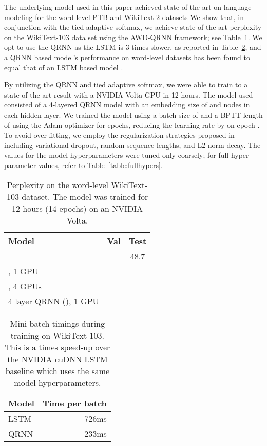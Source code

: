 \documentclass{article}
\begin{document}
The underlying model used in this paper achieved state-of-the-art on language modeling for the word-level PTB and WikiText-2 datasets \cite{merity2018regularizing}
We show that, in conjunction with the tied adaptive softmax, we achieve state-of-the-art perplexity on the WikiText-103 data set using the AWD-QRNN framework; see Table~\ref{table:wikitext103}.
We opt to use the QRNN as the LSTM is 3 times slower, as reported in Table~\ref{table:wt103time}, and a QRNN based model's performance on word-level datasets has been found to equal that of an LSTM based model \citet{merity2018regularizing}.

By utilizing the QRNN and tied adaptive softmax, we were able to train to a state-of-the-art result with a NVIDIA Volta GPU in 12 hours.
The model used consisted of a 4-layered QRNN model with an embedding size of  and  nodes in each hidden layer.
We trained the model using a batch size of  and a BPTT length of  using the Adam optimizer \cite{kingma2014adam} for  epochs, reducing the learning rate by  on epoch .
To avoid over-fitting, we employ the regularization strategies proposed in \cite{merity2018regularizing} including variational dropout, random sequence lengths, and L2-norm decay.
The values for the model hyperparameters were tuned only coarsely; for full hyper-parameter values, refer to Table~\ref{table:fullhypers}.

\begin{table}[t]
\centering
\begin{tabular}{l|cc}
\toprule
\bf Model & \bf Val &  \bf Test \\
\midrule
\citet{Grave2016} & -- & 48.7 \\
\citet{dauphin2016language}, 1 GPU & -- &  \\
\citet{dauphin2016language}, 4 GPUs & -- &  \\
\midrule
4 layer QRNN (), 1 GPU &  &  \\
\bottomrule
\end{tabular}
\caption{Perplexity on the word-level WikiText-103 dataset.
The model was trained for 12 hours (14 epochs) on an NVIDIA Volta.
\label{table:wikitext103}
}
\end{table}

\begin{table}[t]
\centering
\begin{tabular}{l|r}
\toprule
\bf Model & \bf Time per batch \\
\midrule
LSTM & 726ms \\
QRNN & 233ms \\
\bottomrule
\end{tabular}
\caption{Mini-batch timings during training on WikiText-103.
This is a  times speed-up over the NVIDIA cuDNN LSTM baseline which uses the same model hyperparameters.
\label{table:wt103time}}
\end{table}
\end{document}
